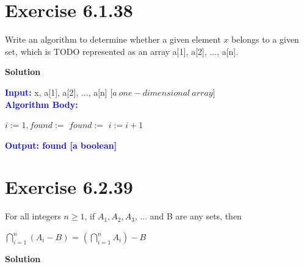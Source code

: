 \documentclass{article}
\newcommand{\enterProblemHeader}[1]{
    \nobreak\extramarks{}{Exercise {#1} continued on next page\ldots}\nobreak{}
    \nobreak\extramarks{Exercise {#1} (continued)}{Exercise {#1} continued on next page\ldots}\nobreak{}
}
\newcommand{\exitProblemHeader}[1]{
    \nobreak\extramarks{Exercise {#1} (continued)}{Exercise {#1} continued on next page\ldots}\nobreak{}
    \nobreak\extramarks{Exercise \arabic{#1}}{}\nobreak{}
}
\newenvironment{homeworkProblem}[1][-1]{
    \nobreak\extramarks{Page \thepage}{}\nobreak{}
    \section{Exercise {#1}}
}{
}
\begin{document}
\begin{homeworkProblem}[6.1.38]
    Write an algorithm to determine whether a given element \(x\) belongs to a
    given set, which is TODO represented as an array a[1], a[2], ..., a[n].\newline

    \textbf{Solution}\newline

    \textbf{\textcolor{blue}{Input:}} x, a[1], a[2], ..., a[n] [\(a~one-dimensional~array\)]\newline
    \\
    \textbf{\textcolor{blue}{Algorithm Body: }}\newline

    \begin{algorithmic}
    \State $i := 1, found :=$ \False
            \State $found :=$ \True
        \EndIf
        \State $i := i + 1$
    \EndWhile\newline
    \end{algorithmic}
    \textbf{\textcolor{blue}{Output: found [a boolean]}}
\end{homeworkProblem}

\begin{homeworkProblem}[6.2.39]
    For all integers $n \geq 1$, if $A_{1}, A_{2}, A_{3}$, ... and B are any sets,
    then \newline

    $\bigcap \limits_{i=1}^n \left(A_{i} - B \right)$ = $\left(\bigcap \limits_{i=1}^n A_{i} \right) - B$
    \newline

    \textbf{Solution}\newline


\end{homeworkProblem}
\end{document}
